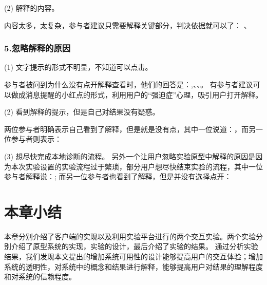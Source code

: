 (2) 解释的内容。

内容太多，太复杂，参与者建议只需要解释关键部分，判决依据就可以了：
、

\subsubsection{5.忽略解释的原因}
(1) 文字提示的形式不明显，不知道可以点击。

参与者被问到为什么没有点开解释查看时，他们的回答是：,、、。
有参与者建议可以做成消息提醒的小红点的形式，利用用户的“强迫症”心理，吸引用户打开解释。

(2) 看到解释的提示，但是自己对结果没有疑惑。

两位参与者明确表示自己看到了解释，但是就是没有点，其中一位说道：，而另一位参与者则表示：


(3) 想尽快完成本地诊断的流程。
 另外一个让用户忽略实验原型中解释的原因是因为本次实验设置的实验流程过于繁琐，部分用户想尽快结束实验的流程，其中一位参与者解释说：;
 而另一位参与者也看到了解释，但是并没有选择点开：


\section{本章小结}

本章分别介绍了客户端的实现以及利用实验平台进行的两个交互实验。两个实验分别介绍了原型系统的实现，实验的设计，最后介绍了实验的结果。
通过分析实验结果，我们发现本文提出的增加系统可用性的设计能够提高用户的交互体验；增加系统的透明性，对系统中的概念和结果进行解释，能够提高用户对结果的理解程度和对系统的信赖程度。


